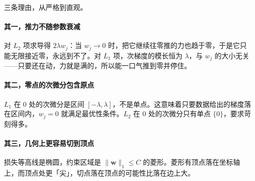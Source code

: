 \documentclass[11pt,a4paper,fontset=windows,zihao=-4]{ctexart}
\newcommand{\bw}{\mathbf{w}}
\newcommand{\norm}[1]{\lVert #1\rVert}
\begin{document}
三条理由，从严格到直观。

\paragraph{其一，推力不随参数衰减}
对 $L_2$ 项求导得 $2\lambda w_j$：当 $w_j\to0$ 时，把它继续往零推的力也趋于零，于是它只能无限接近零，永远到不了。对 $L_1$ 项，次梯度的模长恒为 $\lambda$，与 $w_j$ 的大小无关——只要还在动，力就是满的，所以能一口气推到零并停住。

\paragraph{其二，零点的次微分包含原点}
$L_1$ 在 $0$ 处的次微分是区间 $[-\lambda,\lambda]$，不是单点。这意味着只要数据给出的梯度落在区间内，$w_j=0$ 就满足最优性条件。$L_2$ 在 $0$ 处的次微分只有单点 $\{0\}$，要求苛刻得多。

\paragraph{其三，几何上更容易切到顶点}
损失等高线是椭圆，约束区域是 $\norm{\bw}_1\le C$ 的菱形。菱形有顶点落在坐标轴上，而顶点处更「尖」，切点落在顶点的可能性比落在边上大。
\end{document}
